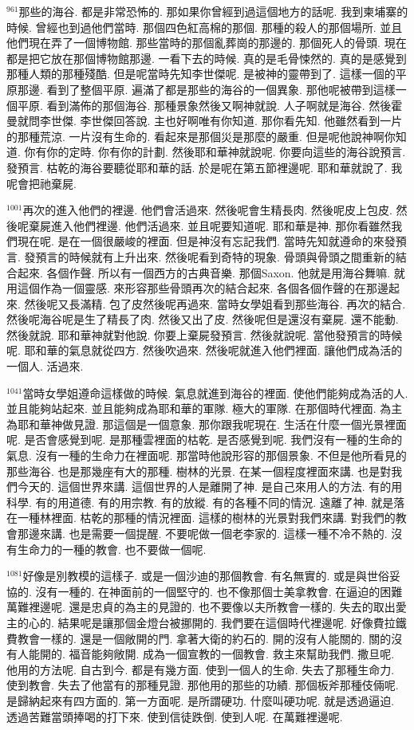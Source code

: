 \documentclass{book}
\begin{document}
$^{961}$那些的海谷.
都是非常恐怖的.
那如果你曾經到過這個地方的話呢.
我到柬埔寨的時候.
曾經也到過他們當時.
那個四色紅高棉的那個.
那種的殺人的那個場所.
並且他們現在弄了一個博物館.
那些當時的那個亂葬崗的那邊的.
那個死人的骨頭.
現在都是把它放在那個博物館那邊.
一看下去的時候.
真的是毛骨悚然的.
真的是感覺到那種人類的那種殘酷.
但是呢當時先知李世傑呢.
是被神的靈帶到了.
這樣一個的平原那邊.
看到了整個平原.
遍滿了都是那些的海谷的一個異象.
那他呢被帶到這樣一個平原.
看到滿佈的那個海谷.
那種景象然後又啊神就說.
人子啊就是海谷.
然後霍曼就問李世傑.
李世傑回答說.
主也好啊唯有你知道.
那你看先知.
他雖然看到一片的那種荒涼.
一片沒有生命的.
看起來是那個災是那麼的嚴重.
但是呢他說神啊你知道.
你有你的定時.
你有你的計劃.
然後耶和華神就說呢.
你要向這些的海谷說預言.
發預言.
枯乾的海谷要聽從耶和華的話.
於是呢在第五節裡邊呢.
耶和華就說了.
我呢會把祂棄屍.

$^{1001}$再次的進入他們的裡邊.
他們會活過來.
然後呢會生精長肉.
然後呢皮上包皮.
然後呢棄屍進入他們裡邊.
他們活過來.
並且呢要知道呢.
耶和華是神.
那你看雖然我們現在呢.
是在一個很嚴峻的裡面.
但是神沒有忘記我們.
當時先知就遵命的來發預言.
發預言的時候就有上升出來.
然後呢看到奇特的現象.
骨頭與骨頭之間重新的結合起來.
各個作聲.
所以有一個西方的古典音樂.
那個Saxon.
他就是用海谷舞嘛.
就用這個作為一個靈感.
來形容那些骨頭再次的結合起來.
各個各個作聲的在那邊起來.
然後呢又長滿精.
包了皮然後呢再過來.
當時女學姐看到那些海谷.
再次的結合.
然後呢海谷呢是生了精長了肉.
然後又出了皮.
然後呢但是還沒有棄屍.
還不能動.
然後就說.
耶和華神就對他說.
你要上棄屍發預言.
然後就說呢.
當他發預言的時候呢.
耶和華的氣息就從四方.
然後吹過來.
然後呢就進入他們裡面.
讓他們成為活的一個人.
活過來.

$^{1041}$當時女學姐遵命這樣做的時候.
氣息就進到海谷的裡面.
使他們能夠成為活的人.
並且能夠站起來.
並且能夠成為耶和華的軍隊.
極大的軍隊.
在那個時代裡面.
為主為耶和華神做見證.
那這個是一個意象.
那你跟我呢現在.
生活在什麼一個光景裡面呢.
是否會感覺到呢.
是那種雲裡面的枯乾.
是否感覺到呢.
我們沒有一種的生命的氣息.
沒有一種的生命力在裡面呢.
那當時他說形容的那個景象.
不但是他所看見的那些海谷.
也是那幾座有大的那種.
樹林的光景.
在某一個程度裡面來講.
也是對我們今天的.
這個世界來講.
這個世界的人是離開了神.
是自己來用人的方法.
有的用科學.
有的用道德.
有的用宗教.
有的放縱.
有的各種不同的情況.
遠離了神.
就是落在一種林裡面.
枯乾的那種的情況裡面.
這樣的樹林的光景對我們來講.
對我們的教會那邊來講.
也是需要一個提醒.
不要呢做一個老李家的.
這樣一種不冷不熱的.
沒有生命力的一種的教會.
也不要做一個呢.

$^{1081}$好像是別教模的這樣子.
或是一個沙迪的那個教會.
有名無實的.
或是與世俗妥協的.
沒有一種的.
在神面前的一個堅守的.
也不像那個士美拿教會.
在逼迫的困難萬難裡邊呢.
還是忠貞的為主的見證的.
也不要像以夫所教會一樣的.
失去的取出愛主的心的.
結果呢是讓那個金燈台被挪開的.
我們要在這個時代裡邊呢.
好像費拉鐵費教會一樣的.
還是一個敞開的門.
拿著大衛的約石的.
開的沒有人能關的.
關的沒有人能開的.
福音能夠敞開.
成為一個宣教的一個教會.
救主來幫助我們.
撒旦呢.
他用的方法呢.
自古到今.
都是有幾方面.
使到一個人的生命.
失去了那種生命力.
使到教會.
失去了他當有的那種見證.
那他用的那些的功績.
那個板斧那種伎倆呢.
是歸納起來有四方面的.
第一方面呢.
是所謂硬功.
什麼叫硬功呢.
就是透過逼迫.
透過苦難當頭捧喝的打下來.
使到信徒跌倒.
使到人呢.
在萬難裡邊呢.
\end{document}

